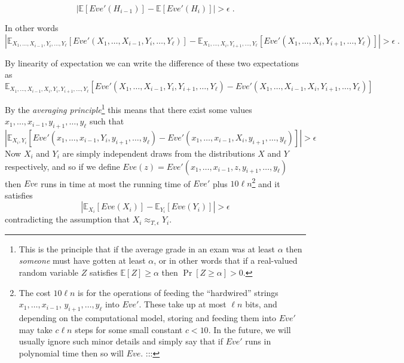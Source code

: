\begin{equation*}
\left| {\mathbb{E}}[ Eve'(H_{i-1}) ] - {\mathbb{E}}[ Eve'(H_i) ] \right|  > \epsilon\;.
\end{equation*}

In other words
\begin{equation*}
\left| {\mathbb{E}}_{X_1,\ldots,X_{i-1},Y_i,\ldots,Y_\ell}[ Eve'(X_1,\ldots,X_{i-1},Y_i,\ldots,Y_\ell) ] - {\mathbb{E}}_{X_1,\ldots,X_i,Y_{i+1},\ldots,Y_\ell}[ Eve'(X_1,\ldots,X_i,Y_{i+1},\ldots,Y_\ell) ]   \right|  > \epsilon\;.
\end{equation*}

By linearity of expectation we can write the difference of these two
expectations as
\begin{equation*}
{\mathbb{E}}_{X_1,\ldots,X_{i-1},X_i,Y_i,Y_{i+1},\ldots,Y_\ell}\left[ Eve'(X_1,\ldots,X_{i-1},Y_i,Y_{i+1},\ldots,Y_\ell) -  Eve'(X_1,\ldots,X_{i-1},X_i,Y_{i+1},\ldots,Y_\ell) \right]
\end{equation*}

By the \emph{averaging principle}\footnote{This is the principle that if
  the average grade in an exam was at least \(\alpha\) then
  \emph{someone} must have gotten at least \(\alpha\), or in other words
  that if a real-valued random variable \(Z\) satisfies
  \({\mathbb{E}}[Z] \geq \alpha\) then \(\Pr[Z\geq \alpha]>0\).} this
means that there exist some values
\(x_1,\ldots,x_{i-1},y_{i+1},\ldots,y_\ell\) such that
\begin{equation*}
\left|{\mathbb{E}}_{X_i,Y_i}\left[ Eve'(x_1,\ldots,x_{i-1},Y_i,y_{i+1},\ldots,y_\ell) -  Eve'(x_1,\ldots,x_{i-1},X_i,y_{i+1},\ldots,y_\ell) \right]\right|>\epsilon
\end{equation*}
Now \(X_i\) and \(Y_i\) are simply independent draws from the
distributions \(X\) and \(Y\) respectively, and so if we define
\(Eve(z) = Eve'(x_1,\ldots,x_{i-1},z,y_{i+1},\ldots,y_\ell)\) then
\(Eve\) runs in time at most the running time of \(Eve'\) plus
\(10\ell n\)\footnote{The cost \(10 \ell n\) is for the operations of
  feeding the ``hardwired'' strings \(x_1,\ldots,x_{i-1}\),
  \(y_{i+1},\ldots,y_\ell\) into \(Eve'\). These take up at most
  \(\ell n\) bits, and depending on the computational model, storing and
  feeding them into \(Eve'\) may take \(c\ell n\) steps for some small
  constant \(c<10\). In the future, we will usually ignore such minor
  details and simply say that if \(Eve'\) runs in polynomial time then
  so will \(Eve\). :::} and it satisfies
\begin{equation*}
\left| {\mathbb{E}}_{X_i} [ Eve(X_i) ] - {\mathbb{E}}_{Y_i} [ Eve(Y_i) ] \right| > \epsilon
\end{equation*}
contradicting the assumption that \(X_i \approx_{T,\epsilon} Y_i\).

